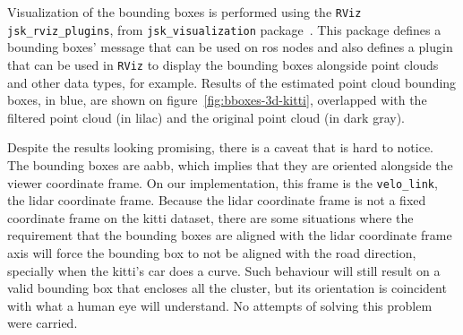 Visualization of the bounding boxes is performed using the \texttt{RViz} \texttt{jsk\_rviz\_plugins}, from \texttt{jsk\_visualization} package~\cite{jsk_visualization}. This package defines a bounding boxes' message that can be used on \ac{ros} nodes and also defines a plugin that can be used in \texttt{RViz} to display the bounding boxes alongside point clouds and other data types, for example. Results of the estimated point cloud bounding boxes, in blue, are shown on figure~\ref{fig:bboxes-3d-kitti}, overlapped with the filtered point cloud (in lilac) and the original point cloud (in dark gray).

Despite the results looking promising, there is a caveat that is hard to notice. The bounding boxes are \acl{aabb}, which implies that they are oriented alongside the viewer coordinate frame. On our implementation, this frame is the \texttt{velo\_link}, the \ac{lidar} coordinate frame. Because the \ac{lidar} coordinate frame is not a fixed coordinate frame on the \ac{kitti} dataset, there are some situations where the requirement that the bounding boxes are aligned with the \ac{lidar} coordinate frame axis will force the bounding box to not be aligned with the road direction, specially when the \ac{kitti}'s car does a curve. Such behaviour will still result on a valid bounding box that encloses all the cluster, but its orientation is coincident with what a human eye will understand. No attempts of solving this problem were carried. 

